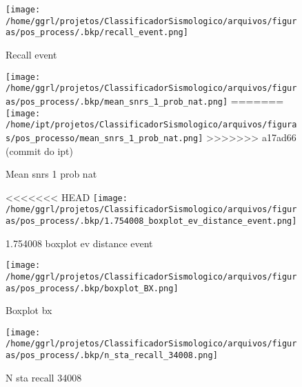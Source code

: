                     \begin{figure}[H]
                        \centering
                        \texttt{[image: /home/ggrl/projetos/ClassificadorSismologico/arquivos/figuras/pos\_process/.bkp/recall\_event.png]}
                        \caption{Recall event}
                        \label{fig:recall_event}
                    \end{figure}
                

                    \begin{figure}[H]
                        \centering
                        \texttt{[image: /home/ggrl/projetos/ClassificadorSismologico/arquivos/figuras/pos\_process/.bkp/mean\_snrs\_1\_prob\_nat.png]}
=======
                        \texttt{[image: /home/ipt/projetos/ClassificadorSismologico/arquivos/figuras/pos\_processo/mean\_snrs\_1\_prob\_nat.png]}
>>>>>>> a17ad66 (commit do ipt)
                        \caption{Mean snrs 1 prob nat}
                        \label{fig:mean_snrs_1_prob_nat}
                    \end{figure}
                

                    \begin{figure}[H]
                        \centering
<<<<<<< HEAD
                        \texttt{[image: /home/ggrl/projetos/ClassificadorSismologico/arquivos/figuras/pos\_process/.bkp/1.754008\_boxplot\_ev\_distance\_event.png]}
                        \caption{1.754008 boxplot ev distance event}
                        \label{fig:1.754008_boxplot_ev_distance_event}
                    \end{figure}
                

                    \begin{figure}[H]
                        \centering
                        \texttt{[image: /home/ggrl/projetos/ClassificadorSismologico/arquivos/figuras/pos\_process/.bkp/boxplot\_BX.png]}
                        \caption{Boxplot bx}
                        \label{fig:boxplot_BX}
                    \end{figure}
                

                    \begin{figure}[H]
                        \centering
                        \texttt{[image: /home/ggrl/projetos/ClassificadorSismologico/arquivos/figuras/pos\_process/.bkp/n\_sta\_recall\_34008.png]}
                        \caption{N sta recall 34008}
                        \label{fig:n_sta_recall_34008}
                    \end{figure}
                

